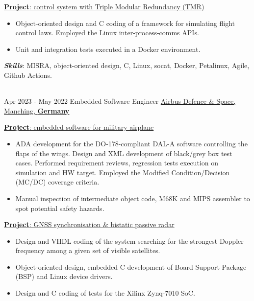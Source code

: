 \documentclass[letterpaper]{twentysecondcv} %
\begin{document}
\begin{twenty}
{            \vspace{2 mm}
            \underline{\textbf{Project}: control system with Triple Modular Redundancy (TMR)}

            \vspace{2 mm}
            \begin{itemize}
                \item Object-oriented design and C coding of a framework for simulating flight control laws. Employed the Linux inter-process-comms APIs.
                \item Unit and integration tests executed in a Docker environment.
            \end{itemize}

            \vspace{2 mm}
            \textbf{\textit{Skills}}: MISRA, object-oriented design, C, Linux, socat, Docker, Petalinux, Agile, Github Actions.
        }\\
    \twentyitem
        {Apr 2023 -}
        {May 2022}
        {Embedded Software Engineer}
        {\href{https://www.airbus.com/en/who-we-are}{Airbus Defence \& Space, Manching, \textbf{Germany}}}
        {}
        {
            \vspace{2 mm}
            \underline{\textbf{Project}: embedded software for military airplane}

            \vspace{2 mm}
            \begin{itemize}
                \item ADA development for the DO-178-compliant DAL-A software controlling the flaps of the wings. Design and XML development of black/grey box test cases. Performed requirement reviews, regression tests execution on simulation and HW target. Employed the Modified Condition/Decision (MC/DC) coverage criteria.
                \item Manual inspection of intermediate object code, M68K and MIPS assembler to spot potential safety hazards.
            \end{itemize}

            \vspace{2 mm}
            \underline{\textbf{Project}: GNSS synchronisation \& bistatic passive radar}

            \vspace{2 mm}
            \begin{itemize}
                \item Design and VHDL coding of the system searching for the strongest Doppler frequency among a given set of visible satellites.
                \item Object-oriented design, embedded C development of Board Support Package (BSP) and Linux device drivers.
                \item Design and C coding of tests for the Xilinx Zynq-7010 SoC.
            \end{itemize}

}
\end{twenty}
\end{document}
